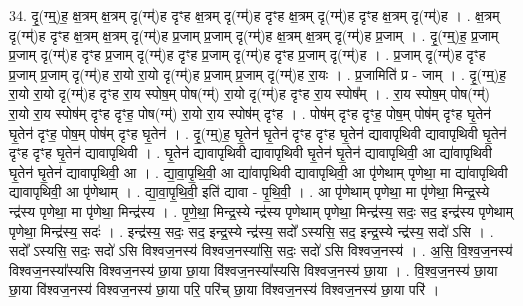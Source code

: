 \documentclass[17pt]{extarticle}
\begin{document}
34. दृ॒(ग्म्॒)ह॒ क्ष॒त्रम् क्ष॒त्रम् दृ(ग्म्॑)ह दृꣳह क्ष॒त्रम् दृ(ग्म्॑)ह दृꣳह क्ष॒त्रम् दृ(ग्म्॑)ह दृꣳह क्ष॒त्रम् दृ(ग्म्॑)ह । . क्ष॒त्रम् दृ(ग्म्॑)ह दृꣳह क्ष॒त्रम् क्ष॒त्रम् दृ(ग्म्॑)ह प्र॒जाम् प्र॒जाम् दृ(ग्म्॑)ह क्ष॒त्रम् क्ष॒त्रम् दृ(ग्म्॑)ह प्र॒जाम् । . दृ॒(ग्म्॒)ह॒ प्र॒जाम् प्र॒जाम् दृ(ग्म्॑)ह दृꣳह प्र॒जाम् दृ(ग्म्॑)ह दृꣳह प्र॒जाम् दृ(ग्म्॑)ह दृꣳह प्र॒जाम् दृ(ग्म्॑)ह । . प्र॒जाम् दृ(ग्म्॑)ह दृꣳह प्र॒जाम् प्र॒जाम् दृ(ग्म्॑)ह रा॒यो रा॒यो दृ(ग्म्॑)ह प्र॒जाम् प्र॒जाम् दृ(ग्म्॑)ह रा॒यः । . प्र॒जामिति॑ प्र - जाम् । . दृ॒(ग्म्॒)ह॒ रा॒यो रा॒यो दृ(ग्म्॑)ह दृꣳह रा॒य स्पोष॒म् पोष(ग्म्॑) रा॒यो दृ(ग्म्॑)ह दृꣳह रा॒य स्पोष᳚म् । . रा॒य स्पोष॒म् पोष(ग्म्॑) रा॒यो रा॒य स्पोष॑म् दृꣳह दृꣳह॒ पोष(ग्म्॑) रा॒यो रा॒य स्पोष॑म् दृꣳह । . पोष॑म् दृꣳह दृꣳह॒ पोष॒म् पोष॑म् दृꣳह घृ॒तेन॑ घृ॒तेन॑ दृꣳह॒ पोष॒म् पोष॑म् दृꣳह घृ॒तेन॑ । . दृ॒(ग्म्॒)ह॒ घृ॒तेन॑ घृ॒तेन॑ दृꣳह दृꣳह घृ॒तेन॑ द्यावापृथिवी द्यावापृथिवी घृ॒तेन॑ दृꣳह दृꣳह घृ॒तेन॑ द्यावापृथिवी । . घृ॒तेन॑ द्यावापृथिवी द्यावापृथिवी घृ॒तेन॑ घृ॒तेन॑ द्यावापृथिवी॒ आ द्या॑वापृथिवी घृ॒तेन॑ घृ॒तेन॑ द्यावापृथिवी॒ आ । . द्या॒वा॒पृ॒थि॒वी॒ आ द्या॑वापृथिवी द्यावापृथिवी॒ आ पृ॑णेथाम् पृणेथा॒ मा द्या॑वापृथिवी द्यावापृथिवी॒ आ पृ॑णेथाम् । . द्या॒वा॒पृ॒थि॒वी॒ इति॑ द्यावा - पृ॒थि॒वी॒ । . आ पृ॑णेथाम् पृणेथा॒ मा पृ॑णेथा॒ मिन्द्र॒स्ये न्द्र॑स्य पृणेथा॒ मा पृ॑णेथा॒ मिन्द्र॑स्य । . पृ॒णे॒था॒ मिन्द्र॒स्ये न्द्र॑स्य पृणेथाम् पृणेथा॒ मिन्द्र॑स्य॒ सदः॒ सद॒ इन्द्र॑स्य पृणेथाम् पृणेथा॒ मिन्द्र॑स्य॒ सदः॑ । . इन्द्र॑स्य॒ सदः॒ सद॒ इन्द्र॒स्ये न्द्र॑स्य॒ सदो᳚ ऽस्यसि॒ सद॒ इन्द्र॒स्ये न्द्र॑स्य॒ सदो॑ ऽसि । . सदो᳚ ऽस्यसि॒ सदः॒ सदो॑ ऽसि विश्वज॒नस्य॑ विश्वज॒नस्या॑सि॒ सदः॒ सदो॑ ऽसि विश्वज॒नस्य॑ । . अ॒सि॒ वि॒श्व॒ज॒नस्य॑ विश्वज॒नस्या᳚स्यसि विश्वज॒नस्य॑ छा॒या छा॒या वि॑श्वज॒नस्या᳚स्यसि विश्वज॒नस्य॑ छा॒या । . वि॒श्व॒ज॒नस्य॑ छा॒या छा॒या वि॑श्वज॒नस्य॑ विश्वज॒नस्य॑ छा॒या परि॒ परि॑च् छा॒या वि॑श्वज॒नस्य॑ विश्वज॒नस्य॑ छा॒या परि॑ । \newline
\end{document}
